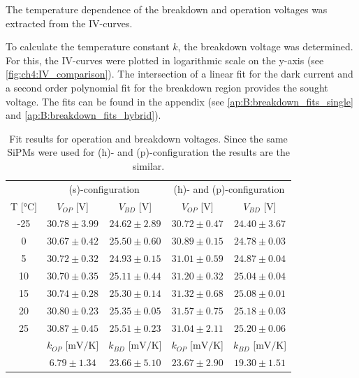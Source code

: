 The temperature dependence of the breakdown and operation voltages was extracted from the IV-curves. \par 
To calculate the temperature constant $k$, the breakdown voltage was determined. For this, the IV-curves were plotted in logarithmic scale on the y-axis (see \ref{fig:ch4:IV_comparison}). The intersection of a linear fit for the dark current and a second order polynomial fit for the breakdown region provides the sought voltage. The fits can be found in the appendix (see \ref{ap:B:breakdown_fits_single} and \ref{ap:B:breakdown_fits_hybrid}). \par 
\begin{table}[b!]
	\centering
	\begin{tabular}{ c|cc|cc } \toprule[2pt]
		& \multicolumn{2}{c|}{(s)-configuration} & \multicolumn{2}{c}{(h)- and (p)-configuration} \\
		T [$\si{\degreeCelsius}]$ & $V_{OP}$ [$\si{\volt}$] & $V_{BD}$ [$\si{\volt}$] & $V_{OP}$ [$\si{\volt}$] & $V_{BD}$ [$\si{\volt}$]  \\ \midrule
		-25 & $30.78\pm 3.99$ & $24.62\pm 2.89$ & $30.72\pm 0.47$ & $24.40\pm 3.67$ \\
		0 & $30.67\pm 0.42$ & $25.50\pm 0.60$ & $30.89\pm 0.15$ & $24.78\pm 0.03$ \\
		5 & $30.72\pm 0.32$ & $24.93\pm 0.15$ & $31.01\pm 0.59$ & $24.87\pm 0.04$ \\
		10 & $30.70\pm 0.35$ & $25.11\pm 0.44$ & $31.20\pm 0.32$ & $25.04\pm 0.04$ \\
		15 & $30.74\pm 0.28$ & $25.30\pm 0.14$ & $31.32\pm 0.68$ & $25.08\pm 0.01$ \\
		20 & $30.80\pm 0.23$ & $25.35\pm 0.05$ & $31.57\pm 0.75$ & $25.18\pm 0.03$ \\
		25 & $30.87\pm 0.45$ & $25.51\pm 0.23$ & $31.04\pm 2.11$ & $25.20\pm 0.06$ \\
		\midrule
		 & $k_{OP}$ [$\si{\milli\volt\per\kelvin}$] & $k_{BD}$ [$\si{\milli\volt\per\kelvin}$] & $k_{OP}$ [$\si{\milli\volt\per\kelvin}$] & $k_{BD}$ [$\si{\milli\volt\per\kelvin}$]  \\
		 & $6.79\pm 1.34$ & $23.66\pm 5.10$ & $23.67\pm 2.90$ & $19.30\pm 1.51$ \\
		\bottomrule[2pt]
	\end{tabular}
	\caption[Fit results for operation and breakdown voltages]{Fit results for operation and breakdown voltages. Since the same SiPMs were used for (h)- and (p)-configuration the results are the similar.}
	\label{ch4:tab:IV_cata}
\end{table}    
